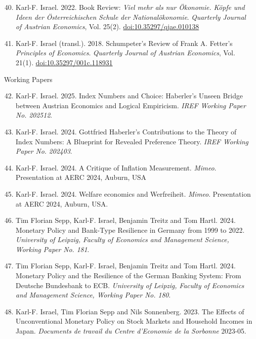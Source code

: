 \documentclass[11pt]{article}
\begin{document}
\begin{enumerate}
\setcounter{enumi}{39}
    \item Karl-F. Israel. 2022. Book Review: \textit{Viel mehr als nur Ökonomie. Köpfe und Ideen der Österreichischen Schule der Nationalökonomie}. \textit{Quarterly Journal of Austrian Economics}, Vol. 25(2). \href{https://doi.org/10.35297/qjae.010138}{doi:10.35297/qjae.010138}
    \item Karl-F. Israel (transl.). 2018. Schumpeter's Review of Frank A. Fetter's \textit{Principles of Economics}. \textit{Quarterly Journal of Austrian Economics}, Vol. 21(1). \href{https://doi.org/10.35297/001c.118931}{doi:10.35297/001c.118931}
\end{enumerate}

\begin{center}
    Working Papers
\end{center}

\begin{enumerate}
\setcounter{enumi}{41}
    \item Karl-F. Israel. 2025. Index Numbers and Choice: Haberler’s Unseen Bridge between Austrian Economics and Logical Empiricism. \textit{IREF Working Paper No. 202512}.
    \item Karl-F. Israel. 2024. Gottfried Haberler's Contributions to the Theory of Index Numbers: A Blueprint for Revealed Preference Theory. \textit{IREF Working Paper No. 202403}.
    \item Karl-F. Israel. 2024. A Critique of Inflation Measurement. \textit{Mimeo}. Presentation at AERC 2024, Auburn, USA
    \item Karl-F. Israel. 2024. Welfare economics and Werfreiheit. \textit{Mimeo}. Presentation at AERC 2024, Auburn, USA. 
    \item Tim Florian Sepp, Karl-F. Israel, Benjamin Treitz and Tom Hartl. 2024. Monetary Policy and Bank-Type Resilience in Germany from 1999 to 2022. \textit{University of Leipzig, Faculty of Economics and Management Science, Working Paper No. 181}.
    \item Tim Florian Sepp, Karl-F. Israel, Benjamin Treitz and Tom Hartl. 2024. Monetary Policy and the Resilience of the German Banking System: From Deutsche Bundesbank to ECB. \textit{University of Leipzig, Faculty of Economics and Management Science, Working Paper No. 180}.
    \item Karl-F. Israel, Tim Florian Sepp and Nils Sonnenberg. 2023. The Effects of Unconventional Monetary Policy on Stock Markets and Household Incomes in Japan. \textit{Documents de travail du Centre d’Economie de la Sorbonne} 2023-05.
\end{enumerate}
\end{document}

